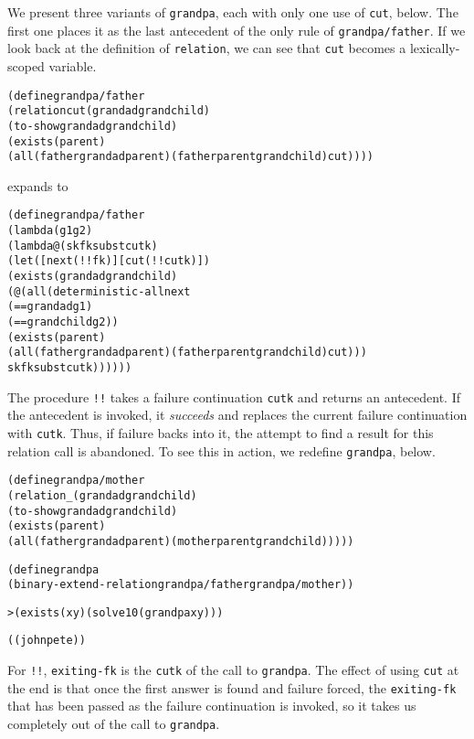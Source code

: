 We present three variants of \texttt{grandpa}, each with only one use
of \texttt{cut}, below. The first one places it as the last
antecedent of the only rule of \texttt{grandpa/father}.  If we look
back at the definition of \texttt{relation}, we can see that
\texttt{cut} becomes a lexically-scoped variable.

\begin{alltt}
(define grandpa/father
  (relation cut (grandad grandchild)
    (to-show grandad grandchild)
    (exists (parent)
      (all (father grandad parent) (father parent grandchild) cut))))
\end{alltt}
\newpage
\noindent
expands to

\begin{alltt}
(define grandpa/father
  (lambda (g1 g2)
    (lambda@ (sk fk subst cutk)
      (let ([next (!! fk)] [cut (!! cutk)])
        (exists (grandad grandchild)
          (@ (all (deterministic-all next
                    (== grandad g1)
                    (== grandchild g2))
               (exists (parent)
                 (all (father grandad parent) (father parent grandchild) cut)))
             sk fk subst cutk))))))
\end{alltt}

The procedure \texttt{!!} takes a failure continuation \texttt{cutk}
and returns an antecedent.  If the antecedent is invoked, it
\emph{succeeds} and replaces the current failure continuation with
\texttt{cutk}.  Thus, if failure backs into it, the attempt to find a
result for this relation call is abandoned.  To see this in action,
we redefine \texttt{grandpa}, below.

\begin{alltt}
(define grandpa/mother
  (relation _ (grandad grandchild)
    (to-show grandad grandchild)
    (exists (parent)
      (all (father grandad parent) (mother parent grandchild)))))

(define grandpa
  (binary-extend-relation grandpa/father grandpa/mother))
\end{alltt}

\begin{alltt}
> (exists (x y) (solve 10 (grandpa x y)))

((john pete))
\end{alltt}

For \texttt{!!}, \texttt{exiting-fk} is the \texttt{cutk} of the
call to \texttt{grandpa}.  The effect of using \texttt{cut} at
the end is that once the first answer is found and failure forced, the
\texttt{exiting-fk} that has been passed as the failure continuation is
invoked, so it takes us completely out of the call to
\texttt{grandpa}.

